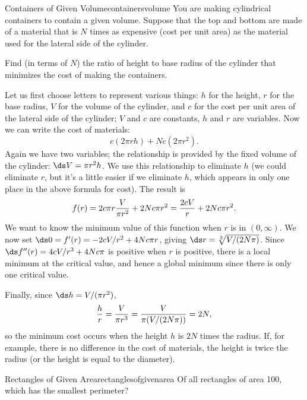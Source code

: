 \begin{example}{Containers of Given Volume}{containersvolume}
You are making cylindrical containers to contain a given volume.  Suppose
that the top and bottom are made of a material that is $N$ times as
expensive (cost per unit area) as the material used for the lateral side of
the cylinder.  

Find (in terms of $N$) the ratio of height to base radius of
the cylinder that minimizes the cost of making the containers.
\end{example}

\begin{solution} 
Let us first choose letters to represent various things: $h$ for the
height, $r$ for the base radius, $V$ for the volume of the
cylinder, and $c$ for the cost per unit area of the lateral side of
the cylinder; $V$ and $c$ are constants, $h$ and $r$ are variables.
Now we can write the cost of materials:
$$
  c(2\pi rh)+Nc(2\pi r^2).
$$
Again we have two variables; the relationship is provided by the fixed
volume of the cylinder: $\ds V=\pi r^2h$. We use this
relationship to eliminate $h$ (we could eliminate $r$, but it's a little easier
if we eliminate $h$, which appears in only one place in the above formula
for cost).  The result is
$$
   f(r)=2c\pi r{V\over\pi r^2}+2Nc\pi r^2={2cV\over r}+2Nc\pi r^2.
$$
We want to know the minimum value of this function when $r$ is in
$(0,\infty)$. 
We now set $\ds 0=f'(r)=-2cV/r^2+4Nc\pi
r$, giving $\ds r={\root 3 \of {V/(2N\pi)}}$.  
Since $\ds f''(r)=4cV/r^3+4Nc\pi$ is positive when $r$ is positive, there
is a local minimum at the critical value, and hence a global minimum
since there is only one critical value.

Finally, since $\ds h=V/(\pi r^2)$, 
$$
{h\over r}={V\over\pi r^3}={V\over \pi(V/(2N\pi))}=2N,
$$ 
so the minimum cost occurs when the height $h$ is $2N$ times the
radius. If, for example, there is no difference in the cost of
materials, the height is twice the radius (or the height is equal to
the diameter).
\end{solution}

\begin{example}{Rectangles of Given Area}{rectanglesofgivenarea}
Of all rectangles of area 100, which has the smallest perimeter?
\end{example}

